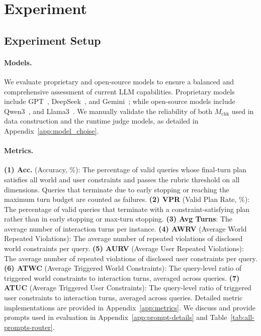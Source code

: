 \section{Experiment}
\label{sec:experiment}

\subsection{Experiment Setup}
\label{sec:experiment-setup}

\paragraph{Models.}
We evaluate proprietary and open-source models to ensure a balanced and comprehensive assessment of current LLM capabilities. 
Proprietary models include GPT~\citep{gpt}, DeepSeek~\citep{deepseek2026v4preview}, and Gemini~\citep{gemini31pro}; while open-source models include Qwen3~\citep{qwen3technicalreport}, and Llama3~\citep{grattafiori2024llama3herdmodels}. 
We manually validate the reliability of both $M_{\mathrm{chk}}$ used in data construction and the runtime judge models, as detailed in Appendix~\ref{app:model_choise}.


\paragraph{Metrics.}
\textbf{(1) Acc.} (Accuracy, \%):
The percentage of valid queries whose final-turn plan satisfies all world and user constraints and passes the rubric threshold on all dimensions. 
Queries that terminate due to early stopping or reaching the maximum turn budget are counted as failures.
\textbf{(2) VPR} (Valid Plan Rate, \%):
The percentage of valid queries that terminate with a constraint-satisfying plan rather than in early stopping or max-turn stopping.
\textbf{(3) Avg Turns}:
The average number of interaction turns per instance.
\textbf{(4) AWRV} (Average World Repeated Violations):
The average number of repeated violations of disclosed world constraints per query.
\textbf{(5) AURV} (Average User Repeated Violations):
The average number of repeated violations of disclosed user constraints per query.
\textbf{(6) ATWC} (Average Triggered World Constraints):
The query-level ratio of triggered world constraints to interaction turns, averaged across queries.
\textbf{(7) ATUC} (Average Triggered User Constraints):
The query-level ratio of triggered user constraints to interaction turns, averaged across queries.
Detailed metric implementations are provided in Appendix~\ref{app:metrics}.
We discuss and provide prompts used in evaluation in Appendix~\ref{app:prompt-details} and Table~\ref{tab:all-prompts-router}. 


